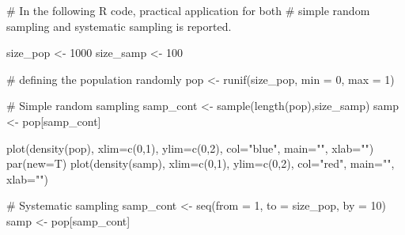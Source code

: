 \documentclass[
  letterpaper,
  DIV=11,
  numbers=noendperiod]{scrreprt}
\newenvironment{Shaded}{\begin{snugshade}}{\end{snugshade}}
\newcommand{\AttributeTok}[1]{\textcolor[rgb]{0.40,0.45,0.13}{#1}}
\newcommand{\CommentTok}[1]{\textcolor[rgb]{0.37,0.37,0.37}{#1}}
\newcommand{\DecValTok}[1]{\textcolor[rgb]{0.68,0.00,0.00}{#1}}
\newcommand{\FunctionTok}[1]{\textcolor[rgb]{0.28,0.35,0.67}{#1}}
\newcommand{\NormalTok}[1]{\textcolor[rgb]{0.00,0.23,0.31}{#1}}
\newcommand{\OtherTok}[1]{\textcolor[rgb]{0.00,0.23,0.31}{#1}}
\newcommand{\StringTok}[1]{\textcolor[rgb]{0.13,0.47,0.30}{#1}}
\begin{document}
\begin{Shaded}
\begin{Highlighting}[]
\CommentTok{\# In the following R code, practical application for both }
\CommentTok{\# simple random sampling and systematic sampling is reported.}

\NormalTok{size\_pop }\OtherTok{\textless{}{-}} \DecValTok{1000}
\NormalTok{size\_samp }\OtherTok{\textless{}{-}} \DecValTok{100}

\CommentTok{\# defining the population randomly}
\NormalTok{pop }\OtherTok{\textless{}{-}} \FunctionTok{runif}\NormalTok{(size\_pop, }\AttributeTok{min =} \DecValTok{0}\NormalTok{, }\AttributeTok{max =} \DecValTok{1}\NormalTok{)}

\CommentTok{\# Simple random sampling}
\NormalTok{samp\_cont }\OtherTok{\textless{}{-}} \FunctionTok{sample}\NormalTok{(}\FunctionTok{length}\NormalTok{(pop),size\_samp)}
\NormalTok{samp }\OtherTok{\textless{}{-}}\NormalTok{ pop[samp\_cont]}

\FunctionTok{plot}\NormalTok{(}\FunctionTok{density}\NormalTok{(pop), }\AttributeTok{xlim=}\FunctionTok{c}\NormalTok{(}\DecValTok{0}\NormalTok{,}\DecValTok{1}\NormalTok{), }\AttributeTok{ylim=}\FunctionTok{c}\NormalTok{(}\DecValTok{0}\NormalTok{,}\DecValTok{2}\NormalTok{), }\AttributeTok{col=}\StringTok{"blue"}\NormalTok{, }\AttributeTok{main=}\StringTok{""}\NormalTok{, }\AttributeTok{xlab=}\StringTok{""}\NormalTok{)}
\FunctionTok{par}\NormalTok{(}\AttributeTok{new=}\NormalTok{T)}
\FunctionTok{plot}\NormalTok{(}\FunctionTok{density}\NormalTok{(samp), }\AttributeTok{xlim=}\FunctionTok{c}\NormalTok{(}\DecValTok{0}\NormalTok{,}\DecValTok{1}\NormalTok{), }\AttributeTok{ylim=}\FunctionTok{c}\NormalTok{(}\DecValTok{0}\NormalTok{,}\DecValTok{2}\NormalTok{), }\AttributeTok{col=}\StringTok{"red"}\NormalTok{, }\AttributeTok{main=}\StringTok{""}\NormalTok{, }\AttributeTok{xlab=}\StringTok{""}\NormalTok{)}

\CommentTok{\# Systematic sampling}
\NormalTok{samp\_cont }\OtherTok{\textless{}{-}} \FunctionTok{seq}\NormalTok{(}\AttributeTok{from =} \DecValTok{1}\NormalTok{, }\AttributeTok{to =}\NormalTok{ size\_pop, }\AttributeTok{by =} \DecValTok{10}\NormalTok{)}
\NormalTok{samp }\OtherTok{\textless{}{-}}\NormalTok{ pop[samp\_cont]}


\end{Highlighting}
\end{Shaded}
\end{document}
